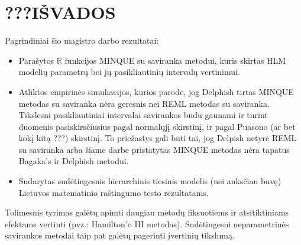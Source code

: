 \documentclass[12pt,a4paper]{article}
\newcommand{\R}{{\mathbb R}}
\begin{document}
\section{???IŠVADOS}
\indent Pagrindiniai šio magistro darbo rezultatai:
\begin{itemize}
\item Parašytos $\R$ funkcijos MINQUE su saviranka metodui, kuris skirtas HLM modelių parametrų bei jų pasikliautinių intervalų vertinimui.
\item Atliktos empirinės simuliacijos, kurios parodė, jog Delphish tirtas MINQUE metodas su saviranka nėra geresnis nei REML metodas su saviranka. Tikslesni pasikliautiniai intervalai savirankos būdu gaunami ir turint duomenis pasiskirsčiusius pagal normalųjį skirstinį, ir pagal Puasono (ar bet kokį kitą ???) skirstinį. To priežastys gali būti tai, jog Delpish netyrė REML su saviranka arba šiame darbe pristatytas MINQUE metodas nėra tapatus Bagaka's ir Delphish metodui.

\item Sudarytas sudėtingesnis hierarchinis tiesinis modelis (nei anksčiau buvę) Lietuvos matematinio raštingumo testo rezultatams.
\end{itemize}

\indent Tolimesnis tyrimas galėtų apimti daugiau metodų fiksuotiems ir atsitiktiniams efektams vertinti (pvz.: Hamilton'o III metodas). Sudėtingesni neparametrinės savirankos metodai taip pat galėtų pagerinti įvertinių tikslumą.


\newpage
\end{document}
